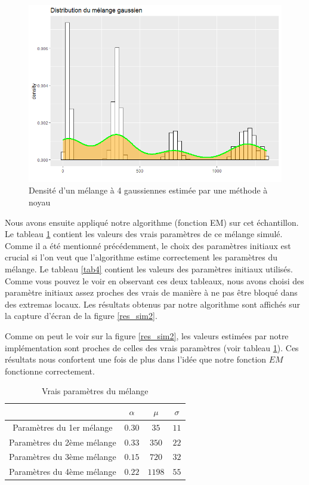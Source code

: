 \documentclass[a4paper,french,10pt]{article}
\begin{document}
\begin{figure}[htp] 
	\centering
	\includegraphics[scale=0.5]{images/dens_sim2.png}
	\caption{Densité d'un mélange à 4 gaussiennes estimée par une méthode à noyau}
	\label{density_sim2}
\end{figure}

Nous avons ensuite appliqué notre algorithme (fonction EM) sur cet échantillon. Le tableau \ref{tab3} contient les valeurs des vrais paramètres de ce mélange simulé. Comme il a été mentionné précédemment, le choix des paramètres initiaux est crucial si l'on veut que l'algorithme estime correctement les paramètres du mélange. Le tableau \ref{tab4} contient les valeurs des paramètres initiaux utilisés. Comme vous pouvez le voir en observant ces deux tableaux, nous avons choisi des paramètre initiaux assez proches des vrais de manière à ne pas être bloqué dans des extremas locaux. Les résultats obtenus par notre algorithme sont affichés sur la capture d'écran de la figure \ref{res_sim2}.

Comme on peut le voir sur la figure \ref{res_sim2}, les valeurs estimées par notre implémentation sont proches de celles des vrais paramètres (voir tableau \ref{tab3}). Ces résultats nous confortent une fois de plus dans l'idée que notre fonction $EM$ fonctionne correctement.

\begin{table}[htp]
	\center
	\begin{tabular}{|c||c|c|c|}
		\hline
		& $\alpha$ & $\mu$ & $\sigma$\\
		\hline
		Paramètres du 1er mélange & $0.30$ & $35$ & $11$ \\
		\hline
		Paramètres du 2ème mélange & $0.33$ & $350$ & $22$ \\
		\hline
		Paramètres du 3ème mélange & $0.15$ & $720$ & $32$ \\
		\hline
		Paramètres du 4ème mélange & $0.22$ & $1198$ & $55$ \\
		\hline
	\end{tabular}
	\caption{Vrais paramètres du mélange}
	\label{tab3}
\end{table}
\end{document}
